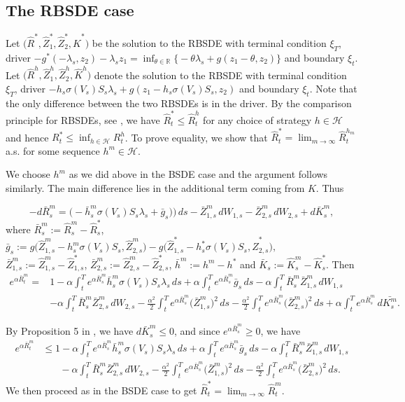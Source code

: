 \documentclass{article}
\newcommand{\R}{\mathbb{R}}
\def\hm{\bar{h}^m}
\def\HR{\hat{R}}
\def\HZ{\hat{Z}}
\def\HK{\hat{K}}
\def\hm{\bar{h}^m}
\begin{document}
\subsection{The RBSDE case}

Let $\bigl(\HR^*, \HZ_1^*, \HZ_2^*, \HK^*\bigr)$ be the solution to the  RBSDE with terminal condition $\xi_T$, driver $- g^*(-\lambda_s, z_2)-\lambda_s z_1 = \inf_{\theta\in \R}\bigl\{-\theta\lambda_s+g( z_1-\theta, z_2)\bigr\}$ and boundary $\xi_t$. Let $\bigl(\HR^h, \HZ_1^h, \HZ_2^h, \HK^h\bigr)$ denote the solution to the RBSDE with terminal condition $\xi_T$, driver $-h_s\sigma(V_s)S_s\lambda_s+ g(z_1- h_s\sigma(V_s)S_s, z_2)$ and boundary $\xi_t$. Note that the only difference between the two RBSDEs is in the driver. By the comparison principle for RBSDEs, see \cite{KLQT02}, we have $\HR_t^*\leq \HR_t^h$ for any choice of strategy $h\in \mathcal H$ and hence $R_t^*\leq \inf_{h\in \mathcal H}R_t^h$. To prove equality, we show that $\HR_t^*=\lim_{m\to\infty}\HR_t^{h_m}$ a.s. for some sequence $h^m\in \mathcal H$.

We choose $h^m$ as we did above in the BSDE case and the argument follows similarly. The main difference lies in the additional term coming from $K$.  Thus

\[
	-d\bar{R}^m_s= \bigl(-\hm_s \sigma(V_s)S_s\lambda_s+ \bar{g}_s)\bigr) \, ds - \bar{Z}^m_{1,s} \, dW_{1,s} - \bar{Z}^m_{2,s} \, dW_{2,s} + d\bar{K}^m_s,
\]
where $\bar{R}^m_s:=\HR_s^m-\HR_s^*$, $\bar{g}_s:=  g\bigl(\HZ_{1,s}^m-h^m_s\sigma(V_s)S_s, \HZ_{2,s}^m\bigr)-  g\bigl(\HZ_{1,s}^*-h^*_s\sigma(V_s)S_s, \HZ_{2,s}^*\bigr),$
$\bar{Z}^m_{1,s}:= \HZ^m_{1,s} - \HZ^*_{1,s}$,  $\bar{Z}^m_{2,s}:= \HZ^m_{2,s} - \HZ^*_{2,s}$, $\bar{h}^m:=h^m-h^*$ and  $\bar{K}_s:= \HK^m_s-\HK^*_s$. Then 
\begin{align*}
	e^{\alpha \bar{R}^m_t} = & 1 -\alpha \int_t^T e^{\alpha \bar{R}^m_s} \hm_s\sigma(V_s)S_s\lambda_s \, ds +\alpha \int_t^T e^{\alpha \bar{R}^m_s}  \bar{g}_s \, ds -\alpha \int_t^T\bar{R}^m_s\bar{Z}^m_{1,s} \, dW_{1,s} \\
	&-\alpha\int_t^T \bar{R}^m_s \bar{Z}^m_{2,s} \, dW_{2,s} -\frac{\alpha^2}{2}\int_t^T e^{\alpha \bar{R}^m_s} \bigl(\bar{Z}^m_{1,s}\bigr)^2 \, ds-\frac{\alpha^2}{2}\int_t^T e^{\alpha \bar{R}^m_s}\bigl(\bar{Z}^m_{2,s}\bigr)^2 \, ds +\alpha\int_t^T e^{\alpha \bar{R}^m_s} \, d\bar{K^m_s}.
\end{align*}

By Proposition 5 in \cite{L14}, we have $d\bar{K}^m_s \leq 0$, and since $e^{\alpha \bar{R}^m_s} \geq 0$, we have
\begin{align*}
	e^{\alpha \bar{R}^m_t} & \leq  1 -\alpha \int_t^T e^{\alpha \bar{R}^m_s} \hm_s\sigma(V_s)S_s\lambda_s \, ds +\alpha \int_t^T e^{\alpha \bar{R}^m_s}  \bar{g}_s \, ds -\alpha \int_t^T\bar{R}^m_s\bar{Z}^m_{1,s} \, dW_{1,s} \\
	& \phantom{=:} -\alpha\int_t^T \bar{R}^m_s \bar{Z}^m_{2,s} \, dW_{2,s} -\frac{\alpha^2}{2}\int_t^T e^{\alpha \bar{R}^m_s} \bigl(\bar{Z}^m_{1,s}\bigr)^2 \, ds -\frac{\alpha^2}{2}\int_t^T e^{\alpha \bar{R}^m_s}\bigl(\bar{Z}^m_{2,s}\bigr)^2 \, ds.
\end{align*}
We then proceed as in the BSDE case to get $\HR_t^*=\lim_{m\to\infty} \HR^m_t$.
\end{document}
